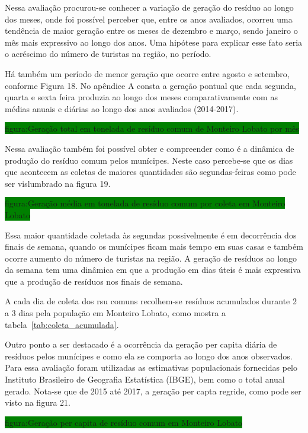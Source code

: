 	Nessa avaliação procurou-se conhecer a variação de geração do resíduo ao longo dos meses, onde foi possível perceber que, entre os anos avaliados, ocorreu uma tendência de maior geração entre os meses de dezembro e março, sendo janeiro o mês mais expressivo ao longo dos anos. Uma hipótese para explicar esse fato seria o acréscimo do número de turistas na região, no período.
	
	Há também um período de menor geração que ocorre entre agosto e setembro, conforme Figura 18. No apêndice A consta a geração pontual que cada segunda, quarta e sexta feira produzia ao longo dos meses comparativamente com as médias anuais e diárias ao longo dos anos avaliados (2014-2017).
	
	\colorbox{green}{figura:Geração total em tonelada de resíduo comum de Monteiro Lobato por mês}
	
	Nessa avaliação também foi possível obter e compreender como é a dinâmica de produção do resíduo comum pelos munícipes. Neste caso percebe-se que os dias que acontecem as coletas de maiores quantidades são segundas-feiras como pode ser vislumbrado na figura 19.
	
	\colorbox{green}{figura:Geração média em tonelada de resíduo comum por coleta em Monteiro Lobato}
	
	Essa maior quantidade coletada às segundas possivelmente é em decorrência dos finais de semana, quando os munícipes ficam mais tempo em suas casas e também ocorre aumento do número de turistas na região. A geração de resíduos ao longo da semana tem uma dinâmica em que a produção em dias úteis é mais expressiva que a produção de resíduos nos finais de semana.
	
	A cada dia de coleta dos \gls{rsu} comuns recolhem-se resíduos acumulados durante 2 a 3 dias pela população em Monteiro Lobato, como mostra a tabela~\ref{tab:coleta_acumulada}.
	
%	
	
	Outro ponto a ser destacado é a ocorrência da geração per capita diária de resíduos pelos munícipes e como ela se comporta ao longo dos anos observados. Para essa avaliação foram utilizadas as estimativas populacionais fornecidas pelo Instituto Brasileiro de Geografia Estatística (IBGE), bem como o total anual gerado. Nota-se que de 2015 até 2017, a geração per capta regride, como pode ser visto na figura 21.
	
	\colorbox{green}{figura:Geração per capita de resíduo comum em Monteiro Lobato}
	
